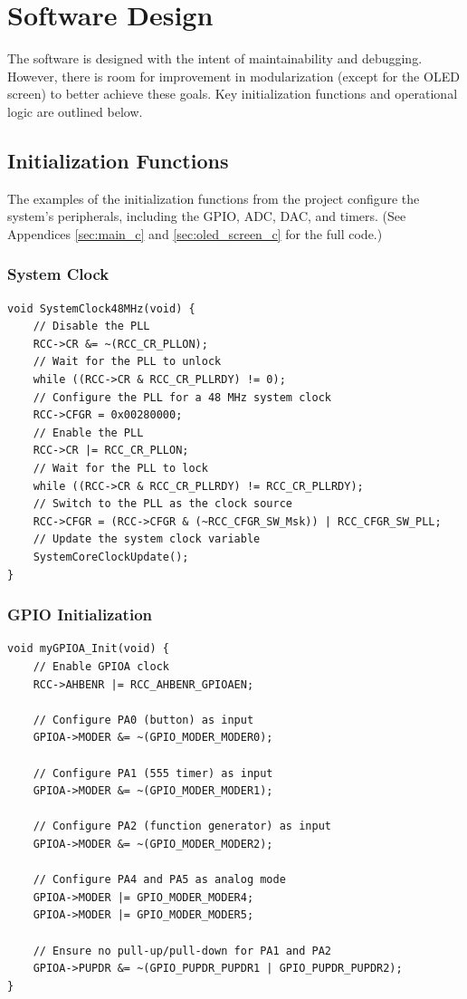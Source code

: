 \newpage

\section{Software Design}
The software is designed with the intent of maintainability and debugging. However, there is room for improvement in modularization (except for the OLED screen) to better achieve these goals. Key initialization functions and operational logic are outlined below.

\subsection{Initialization Functions}
The examples of the initialization functions from the project configure the system's peripherals, including the GPIO, ADC, DAC, and timers. (See Appendices \ref{sec:main_c} and \ref{sec:oled_screen_c} for the full code.)

\subsubsection{System Clock}
\begin{lstlisting}[caption=System Clock Initialization Function \cite{iox}]
void SystemClock48MHz(void) {
    // Disable the PLL
    RCC->CR &= ~(RCC_CR_PLLON);
    // Wait for the PLL to unlock
    while ((RCC->CR & RCC_CR_PLLRDY) != 0);
    // Configure the PLL for a 48 MHz system clock
    RCC->CFGR = 0x00280000;
    // Enable the PLL
    RCC->CR |= RCC_CR_PLLON;
    // Wait for the PLL to lock
    while ((RCC->CR & RCC_CR_PLLRDY) != RCC_CR_PLLRDY);
    // Switch to the PLL as the clock source
    RCC->CFGR = (RCC->CFGR & (~RCC_CFGR_SW_Msk)) | RCC_CFGR_SW_PLL;
    // Update the system clock variable
    SystemCoreClockUpdate();
}
\end{lstlisting}

\subsubsection{GPIO Initialization}
\begin{lstlisting}[caption=GPIO Port A Initialization Function \cite{iox}]
void myGPIOA_Init(void) {
    // Enable GPIOA clock
    RCC->AHBENR |= RCC_AHBENR_GPIOAEN;
    
    // Configure PA0 (button) as input
    GPIOA->MODER &= ~(GPIO_MODER_MODER0);
    
    // Configure PA1 (555 timer) as input
    GPIOA->MODER &= ~(GPIO_MODER_MODER1);
    
    // Configure PA2 (function generator) as input
    GPIOA->MODER &= ~(GPIO_MODER_MODER2);
    
    // Configure PA4 and PA5 as analog mode
    GPIOA->MODER |= GPIO_MODER_MODER4;
    GPIOA->MODER |= GPIO_MODER_MODER5;
    
    // Ensure no pull-up/pull-down for PA1 and PA2
    GPIOA->PUPDR &= ~(GPIO_PUPDR_PUPDR1 | GPIO_PUPDR_PUPDR2);
}
\end{lstlisting}


